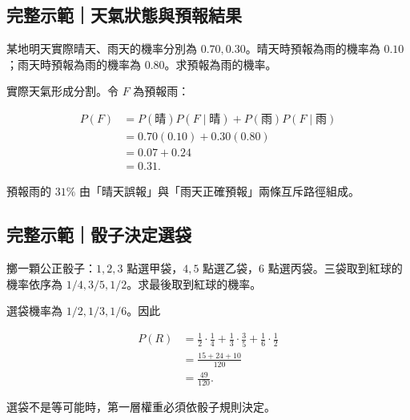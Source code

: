 \documentclass[11pt,a4paper]{article}
\begin{document}
\begin{HandoutWorkedExample}

\subsection{完整示範｜天氣狀態與預報結果}\label{ux5b8cux6574ux793aux7bc4ux5929ux6c23ux72c0ux614bux8207ux9810ux5831ux7d50ux679c}

某地明天實際晴天、雨天的機率分別為 \(0.70,0.30\)。晴天時預報為雨的機率為 \(0.10\)；雨天時預報為雨的機率為 \(0.80\)。求預報為雨的機率。

實際天氣形成分割。令 \(F\) 為預報雨：

\[
\begin{aligned}
P(F)
&=P(\text{晴})P(F\mid \text{晴})+P(\text{雨})P(F\mid \text{雨})\\
&=0.70(0.10)+0.30(0.80)\\
&=0.07+0.24\\
&=\boxed{0.31}.
\end{aligned}
\]

預報雨的 \(31\%\) 由「晴天誤報」與「雨天正確預報」兩條互斥路徑組成。

\end{HandoutWorkedExample}

\begin{HandoutWorkedExample}

\subsection{完整示範｜骰子決定選袋}\label{ux5b8cux6574ux793aux7bc4ux9ab0ux5b50ux6c7aux5b9aux9078ux888b}

擲一顆公正骰子：\(1,2,3\) 點選甲袋，\(4,5\) 點選乙袋，\(6\) 點選丙袋。三袋取到紅球的機率依序為 \(1/4,3/5,1/2\)。求最後取到紅球的機率。

選袋機率為 \(1/2,1/3,1/6\)。因此

\[
\begin{aligned}
P(R)
&=\frac12\cdot\frac14
+\frac13\cdot\frac35
+\frac16\cdot\frac12\\
&=\frac{15+24+10}{120}\\
&=\boxed{\frac{49}{120}}.
\end{aligned}
\]

選袋不是等可能時，第一層權重必須依骰子規則決定。

\end{HandoutWorkedExample}
\end{document}
